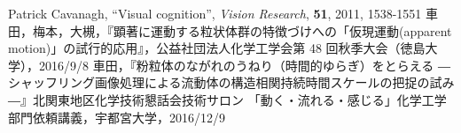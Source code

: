 \documentclass[a4j,12pt,dvipdfmx]{jsarticle}
\begin{document}
\begin{thebibliography}{3}
   Patrick Cavanagh, “Visual cognition”, {\it Vision Research}, {\bf 51}, 2011, 1538-1551
   車田，梅本，大槻，『顕著に運動する粒状体群の特徴づけへの「仮現運動(apparent motion)」の試行的応用』，公益社団法人化学工学会第 48 回秋季大会（徳島大学），2016/9/8
   車田，『粉粒体のながれのうねり（時間的ゆらぎ）をとらえる ―シャッフリング画像処理による流動体の構造相関持続時間スケールの把捉の試み―』北関東地区化学技術懇話会技術サロン 「動く・流れる・感じる」化学工学部門依頼講義，宇都宮大学，2016/12/9
\end{thebibliography}
\end{document}
